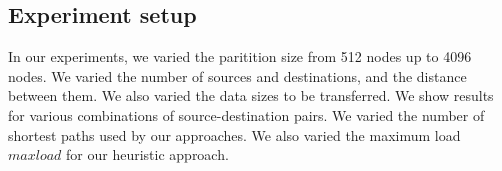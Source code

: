 \subsection{Experiment setup}

In our experiments, we varied the paritition size from 512 nodes up to 4096 nodes. %
We varied the number of sources and destinations, and the distance between them. 
We also varied the data sizes to be transferred. 
We show results for various combinations of source-destination pairs. 
We varied the number of shortest paths used by our approaches. %
We also varied the maximum load $maxload$ for our heuristic approach. 
